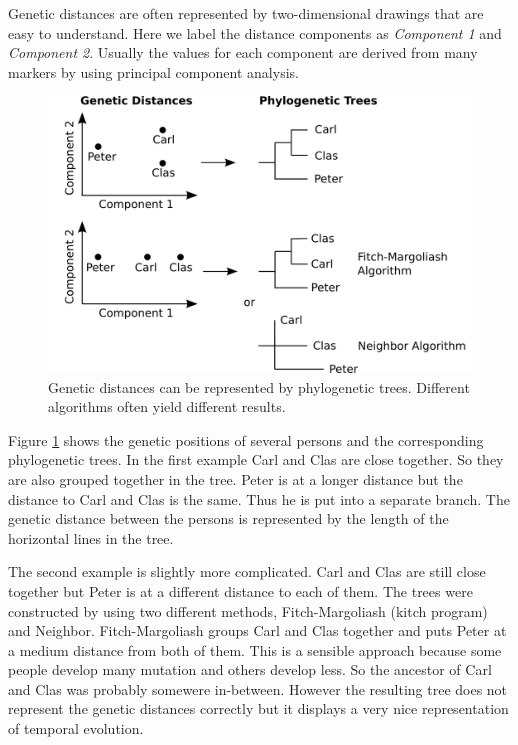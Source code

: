 Genetic distances are often represented by two-dimensional
drawings that are easy to understand. Here we label the
distance components as \emph{Component 1} and 
\emph{Component 2}. Usually the values for each component
are derived from many markers by using principal component
analysis\cite{Shl09}.

\begin{figure}[ht]
\centering
\includegraphics[width=13cm]{img/distancetrees.png}
\caption{\label{distancetrees} Genetic distances can be
represented by phylogenetic trees. Different algorithms
often yield different results.}
\end{figure}

Figure \ref{distancetrees} shows the genetic positions of
several persons and the corresponding phylogenetic trees.
In the first example Carl and Clas are close together. So
they are also grouped together in the tree. Peter is at a
longer distance but the distance to Carl and Clas is the
same. Thus he is put into a separate branch. The genetic
distance between the persons is represented by the length
of the horizontal lines in the tree.

The second example is slightly more complicated. Carl and
Clas are still close together but Peter is at a different
distance to each of them. The trees were constructed by
using two different methods, Fitch-Margoliash (kitch program)
and Neighbor. Fitch-Margoliash groups Carl and Clas together
and puts Peter at a medium distance from both of them. This
is a sensible approach because some people develop many
mutation and others develop less. So the ancestor of Carl and
Clas was probably somewere in-between. However the resulting
tree does not represent the genetic distances correctly but
it displays a very nice representation of temporal evolution.

